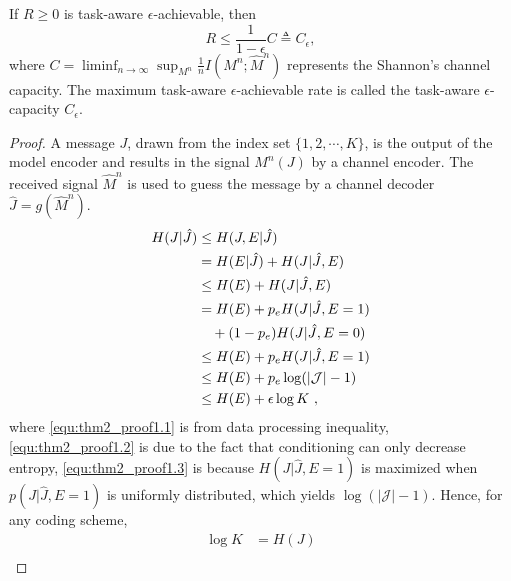 \documentclass[10pt,a4paper]{amsart}
\begin{document}
\begin{theorem}
    \label{thm:max_rate}
    If $R\geq 0$ is task-aware $\epsilon$-achievable, then
    \begin{equation}
        \label{equ:max_rate}
        R \leq \frac{1}{1-\epsilon}C\triangleq C_\epsilon,
    \end{equation}
    where $C=\liminf_{n\to\infty}\sup_{M^n}\frac{1}{n}I(M^n;\hat{M}^n)$ represents the Shannon's channel capacity. The maximum task-aware $\epsilon$-achievable rate is called the task-aware $\epsilon$-capacity $C_\epsilon$.
\end{theorem}

\begin{proof}
    A message $J$, drawn from the index set $\{1,2,\cdots, K\}$, is the output of the model encoder and results in the signal $M^n(J)$ by a channel encoder. The received signal $\hat{M}^n$ is used to guess the message by a channel decoder $\hat{J}=g(\hat{M}^n)$.
    \begin{subequations}
        \label{equ:thm_proof1}
        \begin{align}
            H(J|\hat{J}) & \leq H(J, E | \hat{J}) \label{equ:thm2_proof1.1} \\
            & = H(E|\hat{J}) + H(J|\hat{J}, E) \\
            & \leq H(E) + H(J|\hat{J}, E) \label{equ:thm2_proof1.2} \\
            & = H(E) + p_eH(J|\hat{J}, E=1) \\
            & \notag \quad + (1-p_e)H(J|\hat{J}, E=0) \\
            & \leq H(E) + p_eH(J|\hat{J}, E=1) \\
            & \leq H(E) + p_e\log(|\mathcal{J}|-1) \label{equ:thm2_proof1.3} \\
            & \leq H(E) + \epsilon \log K\ ,
        \end{align}
    \end{subequations}
    where \cref{equ:thm2_proof1.1} is from data processing inequality, \cref{equ:thm2_proof1.2} is due to the fact that conditioning can only decrease entropy, \cref{equ:thm2_proof1.3} is because $H(J|\hat{J},E=1)$ is maximized when $p(J|\hat{J},E=1)$ is uniformly distributed, which yields $\log(\left|\mathcal{J}\right|-1)$. 
    Hence, for any coding scheme,
    \begin{subequations}
        \begin{align}
            \log K & = H(J) \label{equ:thm2_proof2.1} \\

\end{align}
\end{subequations}
\end{proof}
\end{document}
